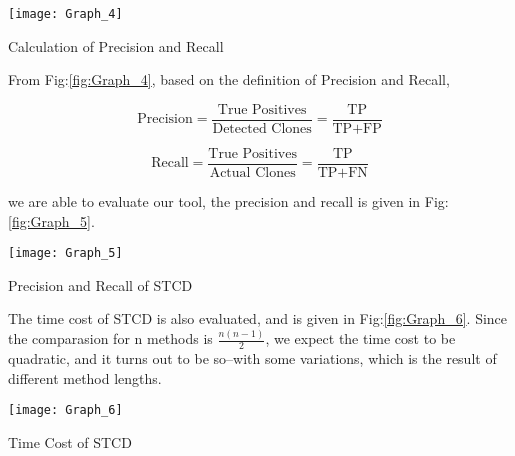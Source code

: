 \documentclass[../main.tex]{subfiles}
\begin{document}
\begin{figurehere}
\centering \texttt{[image: Graph\_4]} 
\caption{Calculation of Precision and Recall} \label{fig:Graph_4}
\end{figurehere}

From Fig:\ref{fig:Graph_4}, based on the definition of Precision and Recall, 

\begin{equation}
\text{Precision} = \frac{ \text{True Positives}} {\text{Detected Clones}} = \frac{ \text{TP}} {\text{TP} + \text{FP}}
\end{equation}

\begin{equation}
\text{Recall} = \frac{ \text{True Positives}} {\text{Actual Clones}} = \frac{ \text{TP}} {\text{TP} + \text{FN}}
\end{equation}

we are able to evaluate our tool, the precision and recall is given in Fig:\ref{fig:Graph_5}.

\begin{figurehere}
\centering \texttt{[image: Graph\_5]} 
\caption{Precision and Recall of STCD} \label{fig:Graph_5}
\end{figurehere}

The time cost of STCD is also evaluated, and is given in Fig:\ref{fig:Graph_6}. Since the comparasion for n methods is $\frac{n(n-1)}{2}$, we expect the time cost to be quadratic, and it turns out to be so--with some variations, which is the result of different method lengths.

\begin{figurehere}
\centering \texttt{[image: Graph\_6]} 
\caption{Time Cost of STCD} \label{fig:Graph_6}
\end{figurehere}
\end{document}
